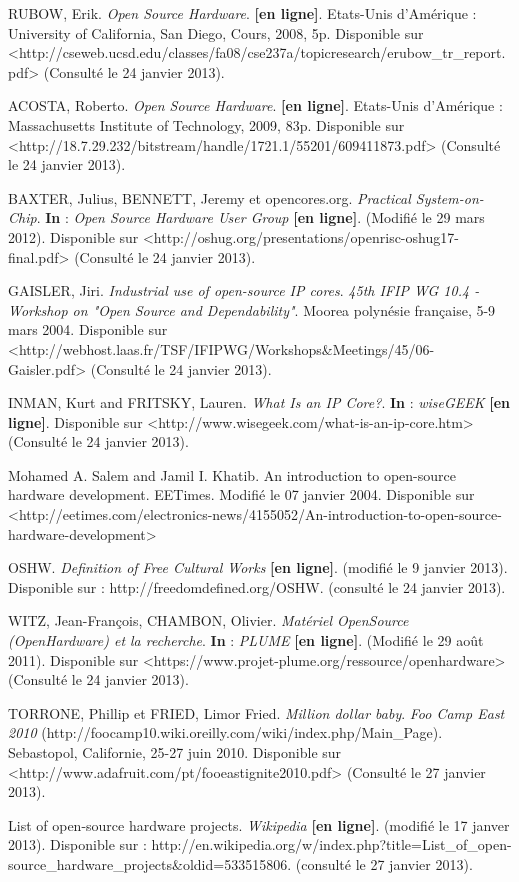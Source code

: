 RUBOW, Erik. \textit{Open Source Hardware}. \textbf{[en ligne]}. Etats-Unis d'Amérique : University of California, San Diego, Cours, 2008, 5p. Disponible sur <http://cseweb.ucsd.edu/classes/fa08/cse237a/topicresearch/erubow_tr_report.pdf> (Consulté le 24 janvier 2013).

ACOSTA, Roberto. \textit{Open Source Hardware}. \textbf{[en ligne]}. Etats-Unis d'Amérique : Massachusetts Institute of Technology, 2009, 83p. Disponible sur <http://18.7.29.232/bitstream/handle/1721.1/55201/609411873.pdf> (Consulté le 24 janvier 2013).

BAXTER, Julius, BENNETT, Jeremy et opencores.org. \textit{Practical System-on-Chip}. \textbf{In} : \textit{Open Source Hardware User Group} \textbf{[en ligne]}. (Modifié le 29 mars 2012). Disponible sur <http://oshug.org/presentations/openrisc-oshug17-final.pdf> (Consulté le 24 janvier 2013).

GAISLER, Jiri. \textit{Industrial use of open-source IP cores}. \textit{45th IFIP WG 10.4 - Workshop on "Open Source and Dependability"}. Moorea polynésie française, 5-9 mars 2004. Disponible sur <http://webhost.laas.fr/TSF/IFIPWG/Workshops&Meetings/45/06-Gaisler.pdf> (Consulté le 24 janvier 2013).

INMAN, Kurt and FRITSKY, Lauren. \textit{What Is an IP Core?}. \textbf{In} : \textit{wiseGEEK} \textbf{[en ligne]}. Disponible sur <http://www.wisegeek.com/what-is-an-ip-core.htm> (Consulté le 24 janvier 2013).

Mohamed A. Salem and Jamil I. Khatib. An introduction to open-source hardware development. EETimes. Modifié le 07 janvier 2004. Disponible sur <http://eetimes.com/electronics-news/4155052/An-introduction-to-open-source-hardware-development>

OSHW. \textit{Definition of Free Cultural Works} \textbf{[en ligne]}. (modifié le 9 janvier 2013). Disponible sur : http://freedomdefined.org/OSHW. (consulté le 24 janvier 2013).

WITZ, Jean-François, CHAMBON, Olivier. \textit{Matériel OpenSource (OpenHardware) et la recherche}. \textbf{In} : \textit{PLUME} \textbf{[en ligne]}. (Modifié le 29 août 2011). Disponible sur <https://www.projet-plume.org/ressource/openhardware> (Consulté le 24 janvier 2013).

TORRONE, Phillip et FRIED, Limor Fried. \textit{Million dollar baby}. \textit{Foo Camp East 2010} (http://foocamp10.wiki.oreilly.com/wiki/index.php/Main_Page). Sebastopol, Californie, 25-27 juin 2010. Disponible sur <http://www.adafruit.com/pt/fooeastignite2010.pdf> (Consulté le 27 janvier 2013).

List of open-source hardware projects. \textit{Wikipedia} \textbf{[en ligne]}. (modifié le 17 janver 2013). Disponible sur : http://en.wikipedia.org/w/index.php?title=List_of_open-source_hardware_projects&oldid=533515806. (consulté le 27 janvier 2013).



